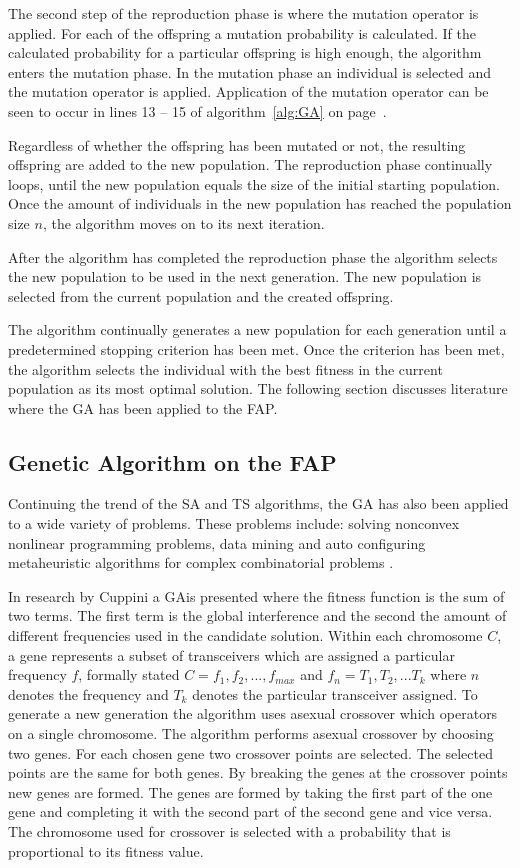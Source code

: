The second step of the reproduction phase is where the mutation operator is applied. For each of the offspring a mutation probability is calculated. If the calculated probability for a particular offspring is high enough, the algorithm enters the mutation phase. In the mutation phase an individual is selected and the mutation operator is applied. Application of the mutation operator can be seen to occur in lines 13 -- 15 of algorithm~\ref{alg:GA} on page~\pageref{alg:GA}.

Regardless of whether the offspring has been mutated or not, the resulting offspring are added to the new population. The reproduction phase continually loops, until the new population equals the size of the initial starting population. Once the amount of individuals in the new population has reached the population size $n$, the algorithm moves on to its next iteration.

After the algorithm has completed the reproduction phase the algorithm selects the new population to be used in the next generation. The new population is selected from the current population and the created offspring.

The algorithm continually generates a new population for each generation until a predetermined stopping criterion has been met. Once the criterion has been met, the algorithm selects the individual with the best fitness in the current population as its most optimal solution. The following section discusses literature where the \gls{GA} has been applied to the \gls{FAP}.

\subsection{Genetic Algorithm on the \gls{FAP}}
\label{sec:gaonfap}
Continuing the trend of the \gls{SA} and \gls{TS} algorithms, the \gls{GA} has also been applied to a wide variety of problems. These problems include: solving nonconvex nonlinear programming problems\cite{GANonConvex}, data mining \cite{SelfAdaptiveDataMiningGA} and auto configuring metaheuristic algorithms for complex combinatorial problems \cite{AutoComplexMeta}.

In research by Cuppini\cite{GACuppini} a \gls{GA}is presented where the fitness function is the sum of two terms. The first term is the global interference and the second the amount of different frequencies used in the candidate solution. Within each chromosome $C$, a gene represents a subset of transceivers which are assigned a particular frequency $f$, formally stated $C = {f_1,f_2, ..., f_{max}}$ and $f_n = {T_1, T_2, ... T_k}$ where $n$ denotes the frequency and $T_k$ denotes the particular transceiver assigned. To generate a new generation the algorithm uses asexual crossover which operators on a single chromosome. The algorithm performs asexual crossover by choosing two genes. For each chosen gene two crossover points are selected. The selected points are the same for both genes. By breaking the genes at the crossover points new genes are formed. The genes are formed by taking the first part of the one gene and completing it with the second part of the second gene and vice versa. The chromosome used for crossover is selected with a probability that is proportional to its fitness value.

